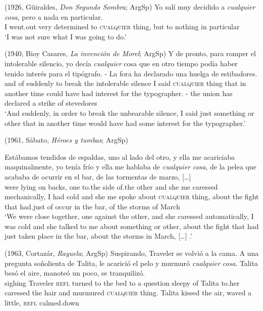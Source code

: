     (1926, Güiraldes, \textit{Don Segundo Sombra}; ArgSp)
\ex \label{ex:key:271-2} \gll Yo salí muy decidido a \textit{cualquier} \textit{cosa}, pero a nada en particular.\\
I went.out very determined to \textsc{cualquier} thing, but to nothing in particular\\
    \glt ‘I was not sure what I was going to do.’

    (1940, Bioy Casares, \textit{La invención de Morel}; ArgSp)
\ex \label{ex:key:271-3} \gll Y de pronto, para romper el intolerable silencio, yo decía \textit{cualquier} cosa que en otro tiempo podía haber tenido interés para el tipógrafo. - La fora ha declarado una huelga de estibadores.\\
and of suddenly to break the intolerable silence I said \textsc{cualquier} thing that in another time could have had interest for the typographer. - the union has declared a strike of stevedores\\
    \glt ‘And suddenly, in order to break the unbearable silence, I said just something or other that in another time would have had some interest for the typographer.’

    (1961, Sábato, \textit{Héroes y tumbas}; ArgSp)
    
\ex \label{ex:key:271-4}
\gll Estábamos tendidos de espaldas, uno al lado del otro, y ella me acariciaba maquinalmente, yo tenía frío y ella me hablaba de \textit{cualquier} \textit{cosa}, de la pelea que acababa de ocurrir en el bar, de las tormentas de marzo, […]\\
were lying on backs, one to.the side of.the other and she me caressed mechanically, I had cold and she me spoke about \textsc{cualquier} thing, about the fight that had.just of occur in the bar, of the storms of March\\
    \glt ‘We were close together, one against the other, and she caressed automatically, I was cold and she talked to me about something or other, about the fight that had just taken place in the bar, about the storms in March, […] .’

    (1963, Cortazár, \textit{Rayuela}; ArgSp)
\ex \label{ex:key:271-5} \gll Suspirando, Traveler se volvió a la cama. A una pregunta soñolienta de Talita, le acarició el pelo y murmuró \textit{cualquier} \textit{cosa}. Talita besó el aire, manoteó un poco, se tranquilizó.\\
sighing Traveler \textsc{refl} turned to the bed to a question sleepy of Talita to.her caressed the hair and murmured \textsc{cualquier} thing. Talita kissed the air, waved a little, \textsc{refl} calmed.down\\

